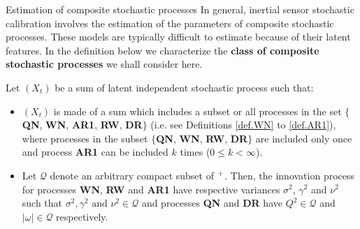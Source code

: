 \documentclass[envcountsect,usenames,dvipsnames]{beamer}
\theoremstyle{mystyle}
\begin{document}
\begin{frame}{Estimation of composite stochastic processes}
\small
    In general, inertial sensor stochastic calibration involves the estimation of the parameters of composite stochastic processes. These models are typically difficult to estimate because of their latent features. In the definition below we characterize the \textbf{{\color{beamer@myorange}class of composite stochastic processes}} we shall consider here.

    \begin{Definition}
    \label{def:class:imu}
    Let $(X_t)$ be a sum of latent independent stochastic process such that:
    \begin{itemize}
    \item $(X_t)$ is made of a sum which includes a subset or all processes in the set $\{$\textbf{{\color{beamer@UIUCblue}QN}}, \textbf{{\color{beamer@UIUCblue}WN}}, \textbf{{\color{beamer@myorange}AR1}}, \textbf{{\color{beamer@UIUCblue}RW}}, \textbf{{\color{beamer@UIUCblue}DR}}$\}$ (i.e. see Definitions \ref{def.WN} to \ref{def.AR1}), where processes in the subset $\{$\textbf{{\color{beamer@UIUCblue}QN}}, \textbf{{\color{beamer@UIUCblue}WN}}, \textbf{{\color{beamer@UIUCblue}RW}}, \textbf{{\color{beamer@UIUCblue}DR}}$\}$ are included only once and process \textbf{{\color{beamer@myorange}AR1}} can be included $k$ times ($0 \leq k < \infty$). \label{A:struc_comp}
   
    \item Let $\mathcal{Q}$ denote an arbitrary compact subset of $\real^+$. Then, the innovation process for processes \textbf{{\color{beamer@UIUCblue}WN}}, \textbf{{\color{beamer@UIUCblue}RW}} and \textbf{{\color{beamer@myorange}AR1}} have respective variances $\sigma^2$, $\gamma^2$ and $\nu^2$ such that $\sigma^2, \gamma^2 \text{ and } \nu^2 \in \mathcal{Q}$ and processes \textbf{{\color{beamer@UIUCblue}QN}} and \textbf{{\color{beamer@UIUCblue}DR}} have $Q^2 \in \mathcal{Q}$ and $|\omega|\in \mathcal{Q}$ respectively. \label{A:not0var}
\end{itemize}
\end{Definition}
\end{frame}
\end{document}
